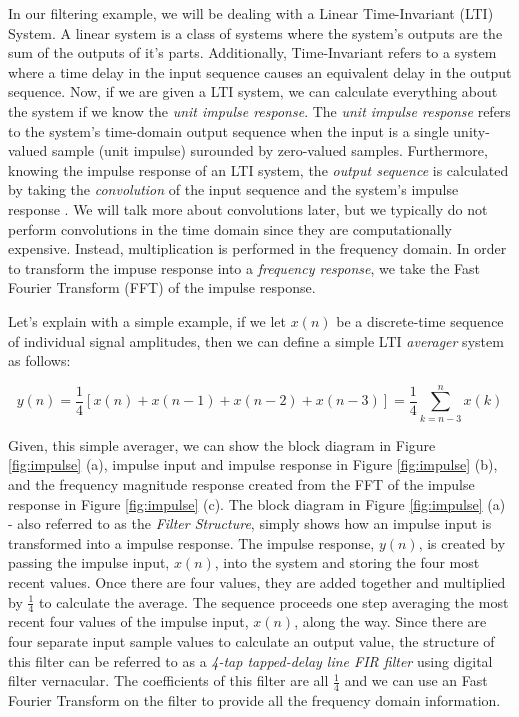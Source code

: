 	In our filtering example, we will be dealing with a Linear Time-Invariant (LTI) System.  A linear system is a class of systems where the system's outputs are the sum of the outputs of it's parts.  Additionally, Time-Invariant refers to a system where a time delay in the input sequence causes an equivalent delay in the output sequence.  Now, if we are given a LTI system, we can calculate everything about the system if we know the \textit{unit impulse response}.  The \textit{unit impulse response} refers to the system's time-domain output sequence when the input is a single unity-valued sample (unit impulse) surounded by zero-valued samples.  Furthermore, knowing the impulse response of an LTI system, the \textit{output sequence} is calculated by taking the \textit{convolution}  of the input sequence and the system's impulse response \cite{lyons:intro}.  We will talk more about convolutions later, but we typically do not perform convolutions in the time domain since they are computationally expensive.  Instead, multiplication is performed in the frequency domain.  In order to transform the impuse response into a \textit{frequency response}, we take the Fast Fourier Transform (FFT) of the impulse response\cite{lyons:intro}.

Let's explain with a simple example, if we let $x(n)$ be a discrete-time sequence of individual signal amplitudes, then we can define a simple LTI \textit{averager} system as follows: 

$$y(n) = \frac{1}{4} \left[ x(n)+x(n-1)+x(n-2)+x(n-3)\right] =  \frac{1}{4}\sum_{k=n-3}^{n} x(k)$$    

Given, this simple averager, we can show the block diagram in Figure \ref{fig:impulse} (a), impulse input and impulse response in Figure \ref{fig:impulse} (b), and the frequency magnitude response created from the FFT of the impulse response in Figure \ref{fig:impulse} (c).  The block diagram in Figure \ref{fig:impulse} (a) - also referred to as the \textit{Filter Structure}, simply shows how an impulse input is transformed into a impulse response.  The impulse response, $y(n)$, is created by passing the impulse input, $x(n)$, into the system and storing the four most recent values.  Once there are four values, they are added together and multiplied by $\frac{1}{4}$ to calculate the average.  The sequence proceeds one step averaging the most recent four values of the impulse input, $x(n)$, along the way.  Since there are four separate input sample values to calculate an output value, the structure of this filter can be referred to as a \textit{4-tap tapped-delay line FIR filter} using digital filter vernacular.  The coefficients of this filter are all $\frac{1}{4}$ and we can use an Fast Fourier Transform on the filter to provide all the frequency domain information.

